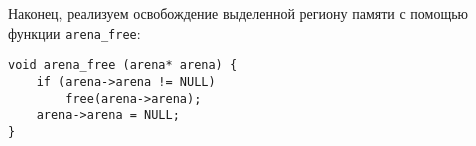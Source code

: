 Наконец, реализуем освобождение выделенной региону памяти с помощью функции
\verb|arena_free|:

\begin{verbatim}
void arena_free (arena* arena) {
    if (arena->arena != NULL)
        free(arena->arena);
    arena->arena = NULL;
}
\end{verbatim}